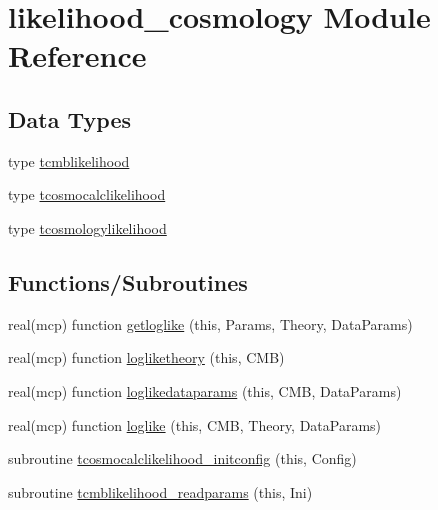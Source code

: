 \hypertarget{namespacelikelihood__cosmology}{}\section{likelihood\+\_\+cosmology Module Reference}
\label{namespacelikelihood__cosmology}
\subsection*{Data Types}
\begin{DoxyCompactItemize}
\item 
type \mbox{\hyperlink{structlikelihood__cosmology_1_1tcmblikelihood}{tcmblikelihood}}
\item 
type \mbox{\hyperlink{structlikelihood__cosmology_1_1tcosmocalclikelihood}{tcosmocalclikelihood}}
\item 
type \mbox{\hyperlink{structlikelihood__cosmology_1_1tcosmologylikelihood}{tcosmologylikelihood}}
\end{DoxyCompactItemize}
\subsection*{Functions/\+Subroutines}
\begin{DoxyCompactItemize}
\item 
real(mcp) function \mbox{\hyperlink{namespacelikelihood__cosmology_a28ab9c3076608cb7b1550060aa9b450b}{getloglike}} (this, Params, Theory, Data\+Params)
\item 
real(mcp) function \mbox{\hyperlink{namespacelikelihood__cosmology_adfac1b06d8d335f24e427fe3629f706c}{logliketheory}} (this, C\+MB)
\item 
real(mcp) function \mbox{\hyperlink{namespacelikelihood__cosmology_a1b2ee95e5e883485f7ba0635f9a5beef}{loglikedataparams}} (this, C\+MB, Data\+Params)
\item 
real(mcp) function \mbox{\hyperlink{namespacelikelihood__cosmology_ad4c3f93cdd27d0b291676092a4e2023b}{loglike}} (this, C\+MB, Theory, Data\+Params)
\item 
subroutine \mbox{\hyperlink{namespacelikelihood__cosmology_a75b0a523a1d5bbf9d32e34de5153ef36}{tcosmocalclikelihood\+\_\+initconfig}} (this, Config)
\item 
subroutine \mbox{\hyperlink{namespacelikelihood__cosmology_a75d41b40f363669474961a1660570174}{tcmblikelihood\+\_\+readparams}} (this, Ini)
\end{DoxyCompactItemize}


